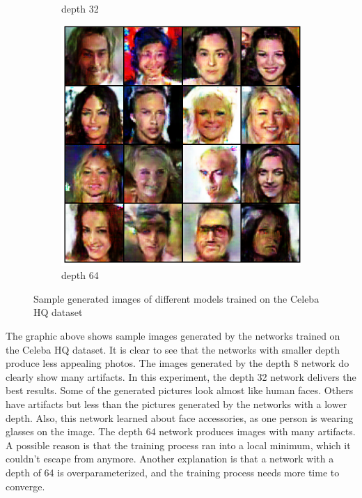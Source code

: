\begin{figure}[H]
\begin{subfigure}[b]{0.24\textwidth}
        \caption{depth 32}
        \label{fig:celeba_32}
    \end{subfigure}
    \hfill
    \begin{subfigure}[b]{0.24\textwidth}
        \centering
        \includegraphics[width=\textwidth]{resources/images/output_celeba_64.eps}
        \caption{depth 64}
        \label{fig:celeba_64}
    \end{subfigure}
    \caption{Sample generated images of different models trained on the Celeba HQ dataset}
    \label{fig:output_celeba}
\end{figure}

The graphic above shows sample images generated by the networks trained on the Celeba HQ dataset. It is clear to see that the networks with smaller depth produce less appealing photos. The images generated by the depth 8 network do clearly show many artifacts. In this experiment, the depth 32 network delivers the best results. Some of the generated pictures look almost like human faces. Others have artifacts but less than the pictures generated by the networks with a lower depth. Also, this network learned about face accessories, as one person is wearing glasses on the image. The depth 64 network produces images with many artifacts. A possible reason is that the training process ran into a local minimum, which it couldn't escape from anymore. Another explanation is that a network with a depth of 64 is overparameterized, and the training process needs more time to converge.

